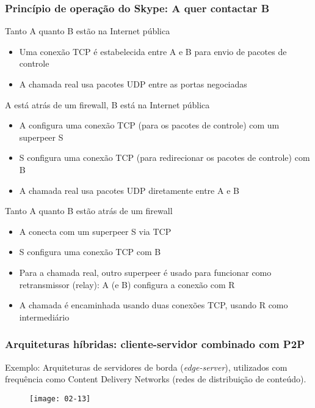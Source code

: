 \documentclass[Ligatures=TeX,table,brazil,svgnames,usetotalslideindicator,compress,10pt]{beamer}
\begin{document}
\begin{frame}
  \frametitle{Princípio de operação do Skype: A quer contactar B}
  \footnotesize
  \begin{block}{Tanto A quanto B estão na Internet pública}
    \begin{itemize}
    \item Uma conexão TCP é estabelecida entre A e B para envio de pacotes de controle
    \item A chamada real usa pacotes UDP entre as portas negociadas
    \end{itemize}
  \end{block}

  \pause
  \begin{block}{A está atrás de um firewall, B está na Internet pública}
    \begin{itemize}
    \item A configura uma conexão TCP (para os pacotes de controle) com um superpeer S
    \item S configura uma conexão TCP (para redirecionar os pacotes de controle) com B
    \item A chamada real usa pacotes UDP diretamente entre A e B
    \end{itemize}
  \end{block}

  \pause
  \begin{block}{Tanto A quanto B estão atrás de um firewall}
    \begin{itemize}
    \item A conecta com um superpeer S via TCP
    \item S configura uma conexão TCP com B
    \item Para a chamada real, outro superpeer é usado para funcionar como retransmissor (\alert{relay}): A (e B) configura a conexão com R
    \item A chamada é encaminhada usando duas conexões TCP, usando R como intermediário
    \end{itemize}
  \end{block}
\end{frame}

\begin{frame}
  \frametitle{Arquiteturas híbridas: cliente-servidor combinado com
    P2P}
  \begin{exampleblock}{Exemplo:}
    Arquiteturas de servidores de borda (\textit{edge-server}), utilizados com frequência como \alert{Content Delivery Networks} (redes de distribuição de conteúdo).
  \end{exampleblock}

  \begin{figure}
    \centering
    \texttt{[image: 02-13]}
  \end{figure}
\end{frame}
\end{document}
